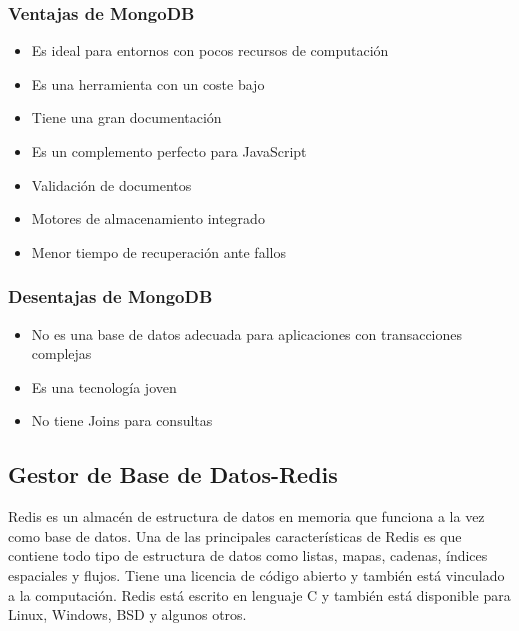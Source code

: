 \documentclass[twoside,twocolumn]{article}
\begin{document}
\subsubsection{Ventajas de MongoDB}
\begin{itemize}
    \item   Es ideal para entornos con pocos recursos de computación
    \item   Es una herramienta con un coste bajo
    \item   Tiene una gran documentación
    \item   Es un complemento perfecto para JavaScript
    \item   Validación de documentos
    \item   Motores de almacenamiento integrado
    \item   Menor tiempo de recuperación ante fallos
    
\end{itemize}
\subsubsection{Desentajas de MongoDB}
\begin{itemize}
    \item    No es una base de datos adecuada para aplicaciones con transacciones complejas
    \item   Es una tecnología joven
    \item   No tiene Joins para consultas
    
\end{itemize}
\subsection{Gestor de Base de Datos-Redis}
Redis es un almacén de estructura de datos en memoria que 
funciona a la vez como base de datos. Una de las principales
 características de Redis es que contiene todo tipo de estructura
  de datos como listas, mapas, cadenas, índices espaciales y flujos. 
  Tiene una licencia de código abierto y también está vinculado a la computación.
   Redis está escrito en lenguaje C y 
también está disponible para Linux, Windows, BSD y algunos otros.
\end{document}

